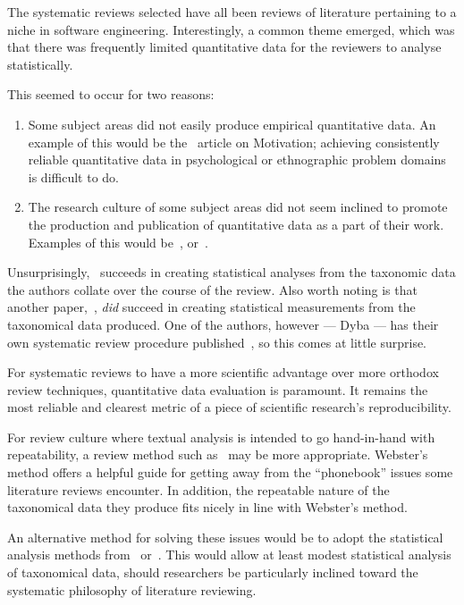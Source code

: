 The systematic reviews selected have all been reviews of literature pertaining to a niche in software engineering. Interestingly, a common theme emerged, which was that there was frequently limited quantitative data for the reviewers to analyse statistically.\par

This seemed to occur for two reasons:
\begin{enumerate}
    \item Some subject areas did not easily produce empirical quantitative data. An example of this would be the~\cite{Benavides} article on Motivation; achieving consistently reliable quantitative data in psychological or ethnographic problem domains is difficult to do.
    \item The research culture of some subject areas did not seem inclined to promote the production and publication of quantitative data as a part of their work. Examples of this would be~\cite{Chen2007}, or~\cite{Smite2010}. 
\end{enumerate}

Unsurprisingly,~\cite{Kitchenham2013} succeeds in creating statistical analyses from the taxonomic data the authors collate over the course of the review. Also worth noting is that another paper,~\cite{Kampenes2007}, \emph{did} succeed in creating statistical measurements from the taxonomical data produced. One of the authors, however --- Dyba --- has their own systematic review procedure published~\citep{dybaguidelines}, so this comes at little surprise.\par

For systematic reviews to have a more scientific advantage over more orthodox review techniques, quantitative data evaluation is paramount. It remains the most reliable and clearest metric of a piece of scientific research's reproducibility.\par

For review culture where textual analysis is intended to go hand-in-hand with repeatability, a review method such as~\cite{Webster2002} may be more appropriate. Webster's method offers a helpful guide for getting away from the ``phonebook'' issues some literature reviews encounter. In addition, the repeatable nature of the taxonomical data they produce fits nicely in line with Webster's method.\par

An alternative method for solving these issues would be to adopt the statistical analysis methods from~\cite{Kitchenham2013} or~\cite{Chen2007}. This would allow at least modest statistical analysis of taxonomical data, should researchers be particularly inclined toward the systematic philosophy of literature reviewing.\par

